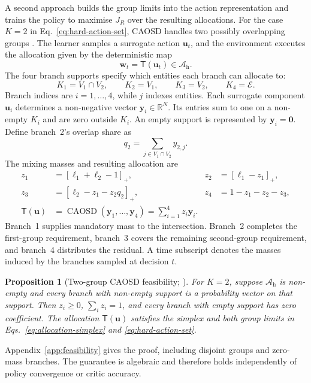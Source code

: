 \documentclass[10pt]{article}
\newcommand{\R}{\mathbb{R}}
\newcommand{\CAOSD}{\operatorname{CAOSD}}
\newtheorem{proposition}{Proposition}
\begin{document}
A second approach builds the group limits into the action representation and trains the policy to maximise $J_R$ over the resulting allocations. For the case $K=2$ in Eq.~\eqref{eq:hard-action-set}, CAOSD handles two possibly overlapping groups \citep{winkel2023}. The learner samples a surrogate action $\bm u_t$, and the environment executes the allocation given by the deterministic map
\begin{equation}
  \bm w_t=\mathsf T(\bm u_t)\in\mathcal A_{\mathrm h}.
  \label{eq:surrogate-map}
\end{equation}
The four branch supports specify which entities each branch can allocate to:
\begin{equation}
  K_1=V_1\cap V_2,\qquad K_2=V_1,\qquad
  K_3=V_2,\qquad K_4=\mathcal E.
  \label{eq:caosd-branches}
\end{equation}
Branch indices are $i=1,\ldots,4$, while $j$ indexes entities. Each surrogate component $\bm u_i$ determines a non-negative vector $\bm y_i\in\R^N$. Its entries sum to one on a non-empty $K_i$ and are zero outside $K_i$. An empty support is represented by $\bm y_i=\bm0$. Define branch~2's overlap share as
\begin{equation}
  q_2=\sum_{j\in V_1\cap V_2}y_{2,j}.
  \label{eq:q2}
\end{equation}
The mixing masses and resulting allocation are
\begin{align}
  z_1&=[\ell_1+\ell_2-1]_+,&
  z_2&=[\ell_1-z_1]_+,\nonumber\\
  z_3&=[\ell_2-z_1-z_2q_2]_+,&
  z_4&=1-z_1-z_2-z_3,
  \label{eq:caosd-masses}\\
  \mathsf T(\bm u)
    &=\CAOSD(\bm y_1,\ldots,\bm y_4)
      =\sum_{i=1}^{4}z_i\bm y_i.
  \label{eq:caosd}
\end{align}
Branch~1 supplies mandatory mass to the intersection. Branch~2 completes the first-group requirement, branch~3 covers the remaining second-group requirement, and branch~4 distributes the residual. A time subscript denotes the masses induced by the branches sampled at decision $t$.

\begin{proposition}[Two-group CAOSD feasibility; \citealp{winkel2023}]
\label{prop:feasibility}
For $K=2$, suppose $\mathcal A_{\mathrm h}$ is non-empty and every branch with non-empty support is a probability vector on that support. Then $z_i\geq0$, $\sum_i z_i=1$, and every branch with empty support has zero coefficient. The allocation $\mathsf T(\bm u)$ satisfies the simplex and both group limits in Eqs.~\eqref{eq:allocation-simplex} and \eqref{eq:hard-action-set}.
\end{proposition}
Appendix~\ref{app:feasibility} gives the proof, including disjoint groups and zero-mass branches. The guarantee is algebraic and therefore holds independently of policy convergence or critic accuracy.
\end{document}
